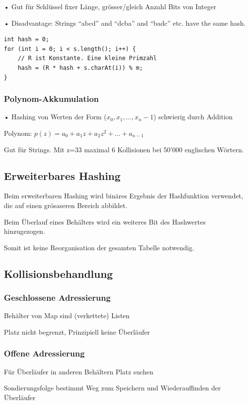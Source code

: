 \begin{multicols*}{4}
		• Gut für Schlüssel fixer Länge, grösser/gleich Anzahl Bits von Integer
		
		• Disadvantage: Strings “abcd” and “dcba” and “badc” etc. have the same hash.
		
		\begin{lstlisting}
int hash = 0;
for (int i = 0; i < s.length(); i++) {
	// R ist Konstante. Eine kleine Primzahl
	hash = (R * hash + s.charAt(i)) % m; 
}
		\end{lstlisting}	
	
	\subsubsection{Polynom-Akkumulation}
	• Hashing von Werten der Form ($x_0, x_1 , ..., x_n-1$) schwierig durch Addition
	
	Polynom:
	$p(z) = a_0 + a_1z + a_2z^2 + ... + a_{n-1}$
		
	Gut für Strings. Mit z=33 maximal 6 Kollisionen bei 50'000 englischen Wörtern.

	\subsection{Erweiterbares Hashing}
	Beim erweiterbaren Hashing wird binäres Ergebnis der Hashfunktion verwendet, die auf einen grösaseren Bereich abbildet.
	
	Beim Überlauf eines Behälters wird ein weiteres Bit des Hashwertes hinzugezogen.
	
	Somit ist keine Reorganisation der gesamten Tabelle notwendig.
		
	\subsection{Kollisionsbehandlung}
		\subsubsection{Geschlossene Adressierung}
		Behälter von Map sind (verkettete) Listen
		
		Platz nicht begrenzt, Prinzipiell keine Überläufer
		
		\subsubsection{Offene Adressierung}
		Für Überläufer in anderen Behältern Platz suchen
		
		Sondierungsfolge bestimmt Weg zum Speichern und Wiederauffinden der Überläufer
		

\end{multicols*}
